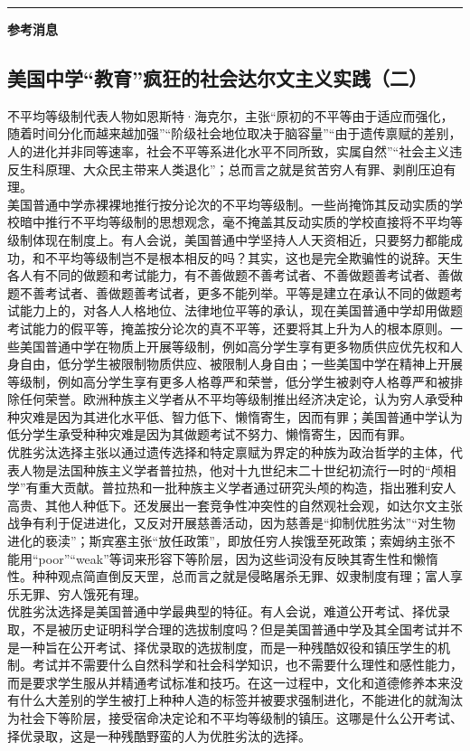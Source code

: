 \documentclass[letterpaper, 12pt]{article}
\begin{document}
\hrule
\vspace{4mm}
\centerline{\huge\textbf{参考消息}}
\begin{multicols}{2}
\section{美国中学“教育”疯狂的社会达尔文主义实践（二）}
不平均等级制代表人物如恩斯特·海克尔，主张“原初的不平等由于适应而强化，随着时间分化而越来越加强”“阶级社会地位取决于脑容量”“由于遗传禀赋的差别，人的进化并非同等速率，社会不平等系进化水平不同所致，实属自然”“社会主义违反生科原理、大众民主带来人类退化”；总而言之就是贫苦穷人有罪、剥削压迫有理。\\

美国普通中学赤裸裸地推行按分论次的不平均等级制。一些尚掩饰其反动实质的学校暗中推行不平均等级制的思想观念，毫不掩盖其反动实质的学校直接将不平均等级制体现在制度上。有人会说，美国普通中学坚持人人天资相近，只要努力都能成功，和不平均等级制岂不是根本相反的吗？其实，这也是完全欺骗性的说辞。天生各人有不同的做题和考试能力，有不善做题不善考试者、不善做题善考试者、善做题不善考试者、善做题善考试者，更多不能列举。平等是建立在承认不同的做题考试能力上的，对各人人格地位、法律地位平等的承认，现在美国普通中学却用做题考试能力的假平等，掩盖按分论次的真不平等，还要将其上升为人的根本原则。一些美国普通中学在物质上开展等级制，例如高分学生享有更多物质供应优先权和人身自由，低分学生被限制物质供应、被限制人身自由；一些美国中学在精神上开展等级制，例如高分学生享有更多人格尊严和荣誉，低分学生被剥夺人格尊严和被排除任何荣誉。欧洲种族主义学者从不平均等级制推出经济决定论，认为穷人承受种种灾难是因为其进化水平低、智力低下、懒惰寄生，因而有罪；美国普通中学认为低分学生承受种种灾难是因为其做题考试不努力、懒惰寄生，因而有罪。\\

优胜劣汰选择主张以通过遗传选择和特定禀赋为界定的种族为政治哲学的主体，代表人物是法国种族主义学者普拉热，他对十九世纪末二十世纪初流行一时的“颅相学”有重大贡献。普拉热和一批种族主义学者通过研究头颅的构造，指出雅利安人高贵、其他人种低下。还发展出一套竞争性冲突性的自然观社会观，如达尔文主张战争有利于促进进化，又反对开展慈善活动，因为慈善是“抑制优胜劣汰”“对生物进化的亵渎”；斯宾塞主张“放任政策”，即放任穷人挨饿至死政策；索姆纳主张不能用“poor”“weak”等词来形容下等阶层，因为这些词没有反映其寄生性和懒惰性。种种观点简直倒反天罡，总而言之就是侵略屠杀无罪、奴隶制度有理；富人享乐无罪、穷人饿死有理。\\

优胜劣汰选择是美国普通中学最典型的特征。有人会说，难道公开考试、择优录取，不是被历史证明科学合理的选拔制度吗？但是美国普通中学及其全国考试并不是一种旨在公开考试、择优录取的选拔制度，而是一种残酷奴役和镇压学生的机制。考试并不需要什么自然科学和社会科学知识，也不需要什么理性和感性能力，而是要求学生服从并精通考试标准和技巧。在这一过程中，文化和道德修养本来没有什么大差别的学生被打上种种人造的标签并被要求强制进化，不能进化的就淘汰为社会下等阶层，接受宿命决定论和不平均等级制的镇压。这哪是什么公开考试、择优录取，这是一种残酷野蛮的人为优胜劣汰的选择。\\


\end{multicols}
\end{document}
